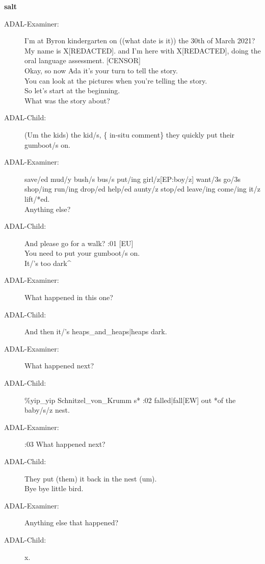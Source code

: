 \documentclass{article}
\newcommand{\turn}[2]{
\item[#1:] #2
}
\begin{document}
\begin{center}\textbf{salt}\end{center}

\begin{description}

\turn{ADAL-Examiner}{I'm at Byron kindergarten on ((what date is it)) the 30th of March 2021?\\
My name is X[REDACTED]. and I'm here with X[REDACTED], doing the oral language assessment. [CENSOR]\\
Okay, so now Ada it's your turn to tell the story.\\
You can look at the pictures when you're telling the story.\\
So let's start at the beginning.\\
What was the story about?}

\turn{ADAL-Child}{(Um the kids) the kid/s, \{ in-situ comment\}  they quickly put their gumboot/s on.}

\turn{ADAL-Examiner}{save/ed mud/y bush/s bus/s put/ing girl/z[EP:boy/z] want/3s go/3s shop/ing run/ing drop/ed help/ed aunty/z stop/ed leave/ing come/ing it/z lift/*ed.\\
Anything else?}

\turn{ADAL-Child}{And please go for a walk? :01 [EU]\\
You need to put your gumboot/s on.\\
It/'s too dark\^{} }

\turn{ADAL-Examiner}{What happened in this one?}

\turn{ADAL-Child}{And then it/'s heaps\_and\_heaps|heaps dark.}

\turn{ADAL-Examiner}{What happened next?}

\turn{ADAL-Child}{\%yip\_yip Schnitzel\_von\_Krumm s* :02 falled|fall[EW] out *of the baby/s/z nest.}

\turn{ADAL-Examiner}{:03 What happened next?}

\turn{ADAL-Child}{They put (them) it back in the nest (um).\\
Bye bye little bird.}

\turn{ADAL-Examiner}{Anything else that happened?}

\turn{ADAL-Child}{x.}


\end{description}
\end{document}
